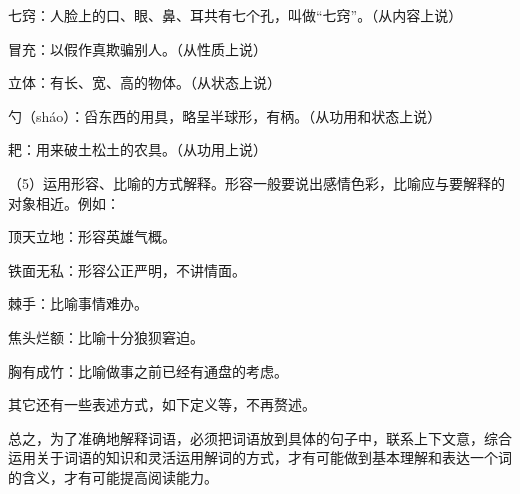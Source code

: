 七窍：人脸上的口、眼、鼻、耳共有七个孔，叫做“七窍”。（从内容上说）

冒充：以假作真欺骗别人。（从性质上说）

立体：有长、宽、高的物体。（从状态上说）

勺（sháo）：舀东西的用具，略呈半球形，有柄。（从功用和状态上说）

耙：用来破土松土的农具。（从功用上说）

（5）运用形容、比喻的方式解释。形容一般要说出感情色彩，比喻应与要解释的对象相近。例如：
\vspace{2em}

顶天立地：形容英雄气概。

铁面无私：形容公正严明，不讲情面。

棘手：比喻事情难办。

焦头烂额：比喻十分狼狈窘迫。

胸有成竹：比喻做事之前已经有通盘的考虑。

\vspace{2em}
其它还有一些表述方式，如下定义等，不再赘述。

总之，为了准确地解释词语，必须把词语放到具体的句子中，联系上下文意，综合运用关于词语的知识和灵活运用解词的方式，才有可能做到基本理解和表达一个词的含义，才有可能提高阅读能力。
\newpage